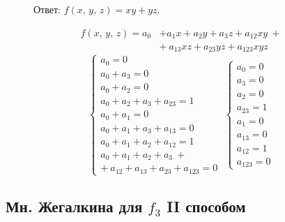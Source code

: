 \documentclass[12pt,a4paper]{article}
\theoremstyle{plain}
\theoremstyle{definition}
\theoremstyle{remark}
\numberwithin{equation}{section}
\begin{document}
\begin{figure}[H]
\begin{minipage}[t]{0.55\linewidth}
    \vspace{0.5em}
    \noindent Ответ: $f(x,\,y,\,z) = xy + yz$.
  \end{minipage} \hfill
  \begin{minipage}[t]{0.46\linewidth}
    \vspace{-1em}
    \begin{equation*}
      \begin{aligned}
        f(x,\,y,\,z) = a_0 &+ a_1x + a_2y + a_3z + a_{12}xy \ + \\ 
                           &+ \ a_{13}xz + a_{23}yz + a_{123}xyz
      \end{aligned}
    \end{equation*}
    \begin{equation*}
      \begin{cases}
        a_0 = 0 \\
        a_0 + a_3 = 0 \\
        a_0 + a_2 = 0 \\
        a_0 + a_2 + a_3 + a_{23} = 1 \\
        a_0 + a_1 = 0 \\ 
        a_0 + a_1 + a_3 + a_{13} = 0 \\
        a_0 + a_1 + a_2 + a_{12} = 1 \\
        a_0 + a_1 + a_2 + a_3 \ + \\ + \ a_{12} + a_{13} + a_{23} + a_{123} = 0
      \end{cases} \;
      \begin{cases}
        a_0 = 0 \\
        a_3 = 0 \\
        a_2 = 0 \\
        a_{23} = 1 \\
        a_1 = 0 \\ 
        a_{13} = 0 \\
        a_{12} = 1 \\
        a_{123} = 0
      \end{cases}
    \end{equation*}
  \end{minipage}
\end{figure}

\vspace{-1.7em}

\subsection{Мн. Жегалкина для $f_3$ II способом}
\end{document}
